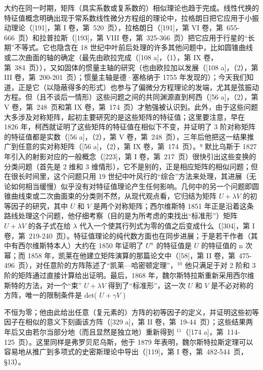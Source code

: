 大约在同一时期，矩阵（具实系数或复系数的）相似理论也趋于完成。线性代换的特征值概念明确出现于常系数线性微分方程组的理论中，拉格朗日把它应用于小振动理论（{[}191{]}，第 I 卷，第~520~页），拉格朗日（{[}191{]}，第 VI 卷，第~655-666~页）和拉普拉斯（{[}193{]}，第 VIII 卷，第~325-366~页）把它应用于行星的“长期”不等式。它也隐含在 18 世纪中叶前后处理的许多其他问题中，比如圆锥曲线或二次曲面的轴的确定（最先由欧拉完成（{[}108 a{]}，（1），第 IX 卷，第~384~页）），又如固体的惯量主轴的研究（也由欧拉加以发展（{[}108 a{]}，（2），第 III 卷，第~200-201~页）；惯量主轴是德·塞格纳于 1755 年发现的）；今天我们知道，正是它（以隐蔽得多的形式）也参与了偏微分方程理论的发端，尤其是弦振动方程。但（且不谈后一情形）这些问题之间的共同渊源直到柯西（{[}56 a{]}，（2），第 V 卷，第~248~页和第 IX 卷，第~174~页）才勉强被认识到。此外，由于这些问题大多涉及对称矩阵，起初主要研究的是这些矩阵的特征值；这里要注意，早在 1826 年，柯西就证明了这些矩阵的特征值在相似下不变，并证明了 3 阶对称矩阵的特征值都是实数（{[}56 a{]}，（2），第 V 卷，第~248~页），三年后他把这一结果推广到任意的实对称矩阵（{[}56 a{]}，（2），第 IX 卷，第~174~页）。⁹ 默比乌斯于 1827 年引入的射影对应的一般概念（{[}223{]}，第 I 卷，第~217~页）很快引出这些变换的分类问题（首先是 2 维和 3 维情形），它不是别的，正是相应矩阵的相似问题；但在很长时间里，这个问题只用 19 世纪中叶风行的“综合”方法来处理，其进展（无论如何相当缓慢）似乎没有对特征值理论产生任何影响。几何中的另一个问题即圆锥曲线束或二次曲面束的分类则不然，从现代观点看，它归结为矩阵 \(U + \lambda V\) 的初等因子的研究，其中 \(U\) 和 \(V\) 是两个对称矩阵；西尔维斯特 1851 年正是沿着这条路线处理这个问题，他仔细考察（目的是为所考虑的束找出“标准形”）矩阵 \(U + \lambda V\) 的各子式在给 \(\lambda\) 代入一个使其行列式为零的值之后变成什么（{[}304{]}，第 I 卷，第~219-240~页）。特征值理论的纯代数方面也在同步进展；于是若干作者（其中有西尔维斯特本人）大约在 1850 年证明了 \(U^n\) 的特征值是 \(U\) 的特征值的 n 次幂；而 1858 年，凯莱在他建立矩阵演算的那篇论文中（{[}58{]}，第 II 卷，第~475-496~页），对任意阶的方阵陈述了“凯莱—哈密顿定理”，\(^{10}\) 他只满足于对 2 阶和 3 阶的矩阵通过直接计算给出证明。最后，1868 年，魏尔斯特拉斯重新采用西尔维斯特的方法，对一个“束” \(U + \lambda V\) 得到了“标准形”，这一次 \(U\) 和 \(V\) 是不必对称的方阵，唯一的限制条件是 det( \(U + \gamma V\) )

不恒为零；他由此给出任意（复元素的）方阵的初等因子的定义，并证明这些初等因子在相似的意义下刻画该方阵（{[}329 a{]}，第 II 卷，第~19-44~页）；这些结果两年后又由若尔当部分地（而且显然是独立地）重新得到 \(^{11}\)（{[}174 a{]}，第~114-125~页）。这里同样是弗罗贝尼乌斯，他于 1879 年表明，魏尔斯特拉斯定理可以容易地从推广到多项式的史密斯理论中导出（{[}119{]}，第 I 卷，第~482-544~页，§13）。


